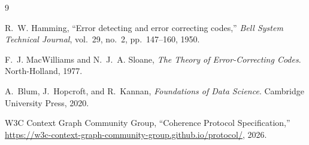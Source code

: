\documentclass[11pt,a4paper]{article}
\begin{document}

\begin{thebibliography}{9}

R.~W. Hamming, ``Error detecting and error correcting codes,'' \emph{Bell System Technical Journal}, vol.~29, no.~2, pp.~147--160, 1950.

F.~J. MacWilliams and N.~J.~A. Sloane, \emph{The Theory of Error-Correcting Codes}. North-Holland, 1977.

A.~Blum, J.~Hopcroft, and R.~Kannan, \emph{Foundations of Data Science}. Cambridge University Press, 2020.

W3C Context Graph Community Group, ``Coherence Protocol Specification,'' \url{https://w3c-context-graph-community-group.github.io/protocol/}, 2026.

\end{thebibliography}
\end{document}
